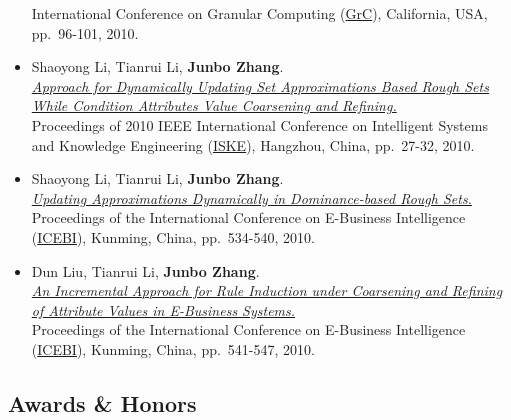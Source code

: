 \documentclass[]{article}
\begin{document}
\begin{itemize}
  International Conference on Granular Computing
  (\href{http://xanadu.cs.sjsu.edu/~grc/grc2010}{GrC}), California, USA,
  pp.~96-101, 2010.
\item
  Shaoyong Li, Tianrui Li, \textbf{Junbo Zhang}.\\
  \href{http://dx.doi.org/10.1109/ISKE.2010.5680788}{\emph{Approach for
  Dynamically Updating Set Approximations Based Rough Sets While
  Condition Attributes Value Coarsening and Refining.}}\\ Proceedings of
  2010 IEEE International Conference on Intelligent Systems and
  Knowledge Engineering
  (\href{http://ieeexplore.ieee.org/xpl/mostRecentIssue.jsp?punumber=5676709}{ISKE}),
  Hangzhou, China, pp.~27-32, 2010.
\item
  Shaoyong Li, Tianrui Li, \textbf{Junbo Zhang}.\\
  \href{http://www.atlantis-press.com/php/paper-details.php?id=2011}{\emph{Updating
  Approximations Dynamically in Dominance-based Rough Sets.}}\\
  Proceedings of the International Conference on E-Business Intelligence
  (\href{http://cnais.sem.tsinghua.edu.cn/icebi2010}{ICEBI}), Kunming,
  China, pp.~534-540, 2010.
\item
  Dun Liu, Tianrui Li, \textbf{Junbo Zhang}.\\
  \href{http://www.atlantis-press.com/php/paper-details.php?id=2070}{\emph{An
  Incremental Approach for Rule Induction under Coarsening and Refining
  of Attribute Values in E-Business Systems.}}\\ Proceedings of the
  International Conference on E-Business Intelligence
  (\href{http://cnais.sem.tsinghua.edu.cn/icebi2010}{ICEBI}), Kunming,
  China, pp.~541-547, 2010.
\end{itemize}

\subsection{Awards \& Honors}\label{awards-honors}
\end{document}
